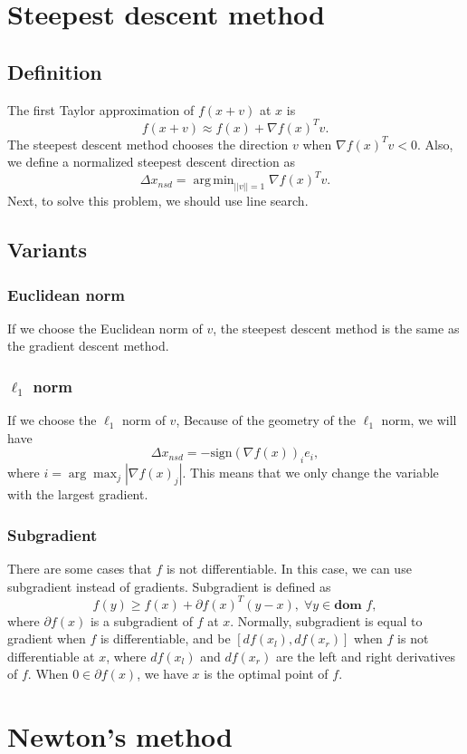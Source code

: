 \documentclass[lang=en,color=blue,mode=fancy,titlestyle=hang]{elegantbook}
\DeclareMathOperator*{\argmin}{arg\,min}
\begin{document}
\section{Steepest descent method}
\subsection{Definition}
The first Taylor approximation of $f(x + v)$ at $x$ is
\[
f(x + v) \approx f(x) + \nabla f(x)^T v.
\]
The steepest descent method chooses the direction $v$ when $\nabla f(x)^T v < 0$. Also, we define
a normalized steepest descent direction as
\[
\Delta x_{nsd} = \argmin_{||v|| = 1} \nabla f(x)^T v.
\]
Next, to solve this problem, we should use line search.

\subsection{Variants}
\subsubsection{Euclidean norm} If we choose the Euclidean norm of $v$, the steepest descent method
is the same as the gradient descent method.

\subsubsection{$\ell_1$ norm} If we choose the $\ell_1$ norm of $v$, Because of the geometry of
the $\ell_1$ norm, we will have
\[
\Delta x_{nsd} = - \text{sign}(\nabla f(x))_i e_i,
\]
where $i = \arg \max_j |\nabla f(x)_j|$. This means that we only change the variable with the largest
gradient.

\subsubsection{Subgradient} There are some cases that $f$ is not differentiable. In this case,
we can use subgradient instead of gradients. Subgradient is defined as
\[
f(y) \geq f(x) + \partial f(x)^T (y - x), \; \forall y \in \textbf{dom } f,
\]
where $\partial f(x)$ is a subgradient of $f$ at $x$. Normally, subgradient is equal to gradient when $f$ is
differentiable, and be $[df(x_l), df(x_r)]$ when $f$ is not differentiable at $x$, where
$df(x_l)$ and $df(x_r)$ are the left and right derivatives of $f$. When $0 \in \partial f(x)$,
we have $x$ is the optimal point of $f$.

\section{Newton's method}
\end{document}
